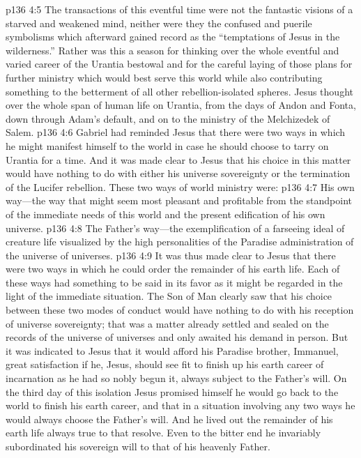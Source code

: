 \vs p136 4:5 The transactions of this eventful time were not the fantastic visions of a starved and weakened mind, neither were they the confused and puerile symbolisms which afterward gained record as the “temptations of Jesus in the wilderness.” Rather was this a season for thinking over the whole eventful and varied career of the Urantia bestowal and for the careful laying of those plans for further ministry which would best serve this world while also contributing something to the betterment of all other rebellion\hyp{}isolated spheres. Jesus thought over the whole span of human life on Urantia, from the days of Andon and Fonta, down through Adam’s default, and on to the ministry of the Melchizedek of Salem.
\vs p136 4:6 Gabriel had reminded Jesus that there were two ways in which he might manifest himself to the world in case he should choose to tarry on Urantia for a time. And it was made clear to Jesus that his choice in this matter would have nothing to do with either his universe sovereignty or the termination of the Lucifer rebellion. These two ways of world ministry were:
\pc \vs p136 4:7 \bibnobreakspace His own way---the way that might seem most pleasant and profitable from the standpoint of the immediate needs of this world and the present edification of his own universe.
\vs p136 4:8 \bibnobreakspace The Father’s way---the exemplification of a farseeing ideal of creature life visualized by the high personalities of the Paradise administration of the universe of universes.
\vs p136 4:9 It was thus made clear to Jesus that there were two ways in which he could order the remainder of his earth life. Each of these ways had something to be said in its favor as it might be regarded in the light of the immediate situation. The Son of Man clearly saw that his choice between these two modes of conduct would have nothing to do with his reception of universe sovereignty; that was a matter already settled and sealed on the records of the universe of universes and only awaited his demand in person. But it was indicated to Jesus that it would afford his Paradise brother, Immanuel, great satisfaction if he, Jesus, should see fit to finish up his earth career of incarnation as he had so nobly begun it, always subject to the Father’s will. On the third day of this isolation Jesus promised himself he would go back to the world to finish his earth career, and that in a situation involving any two ways he would always choose the Father’s will. And he lived out the remainder of his earth life always true to that resolve. Even to the bitter end he invariably subordinated his sovereign will to that of his heavenly Father.
